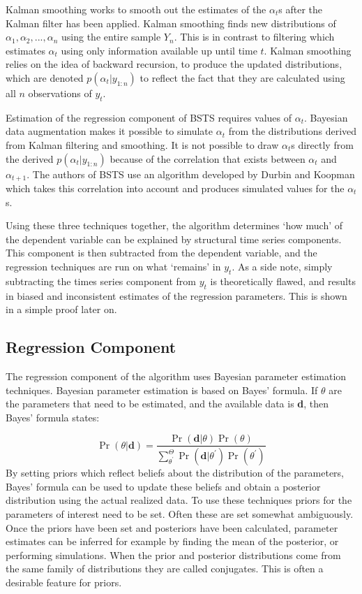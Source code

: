 Kalman smoothing works to smooth out the estimates of the $\alpha_{t}$s after the Kalman filter has been applied. Kalman smoothing finds new distributions of $\alpha_{1}, \alpha_{2},..., \alpha_{n}$ using the entire sample $Y_{n}$.  This is in contrast to filtering which estimates $\alpha_{t}$ using only information available up until time $t$. Kalman smoothing relies on the idea of backward recursion, to produce the updated distributions, which are denoted $p(\alpha_{t} | y_{1:n})$ to reflect the fact that they are calculated using all $n$ observations of $y_{t}$.

Estimation of the regression component of BSTS requires values of $\alpha_{t}$. Bayesian data augmentation makes it possible to simulate $\alpha_{t}$ from the distributions derived from Kalman filtering and smoothing. It is not possible to draw $\alpha_{t}$s directly from the derived $p(\alpha_{t} | y_{1:n})$ because of the correlation that exists between $\alpha_{t}$ and $\alpha_{t+1}$. The authors of BSTS use an algorithm developed by Durbin and Koopman which takes this correlation into account and produces simulated values for the $\alpha_{t}$s. 
 
 
Using these three techniques together, the algorithm determines `how much' of the dependent variable can be explained by structural time series components. This component is then subtracted from the dependent variable, and the regression techniques are run on what `remains' in  $y_{t}$. As a side note, simply subtracting the times series component from $y_{t}$ is theoretically flawed, and results in biased and inconsistent estimates of the regression parameters. This is shown in a simple proof later on. 
 

\subsection{Regression Component}

The regression component of the algorithm uses Bayesian parameter estimation techniques. Bayesian parameter estimation is based on Bayes' formula. If $\theta$ are the parameters that need to be estimated, and the available data is \textbf{d}, then Bayes' formula states:

$$ \Pr(\theta | \mathbf{d}) = \frac{\Pr(\mathbf{d}|\theta)\Pr(\theta)}{\sum_{\theta^{'}}^{\Theta}\Pr(\mathbf{d}|\theta^{'})\Pr(\theta^{'})}$$
By setting priors which reflect beliefs about the distribution of the parameters, Bayes' formula can be used to update these beliefs and obtain a posterior distribution using the actual realized data. 
To use these techniques priors for the parameters of interest need to be set. Often these are set somewhat ambiguously. Once the priors have been set and posteriors have been calculated, parameter estimates can be inferred for example by finding the mean of the posterior, or performing simulations. When the prior and posterior distributions come from the same family of distributions they are called conjugates. This is often a desirable feature for priors. 


